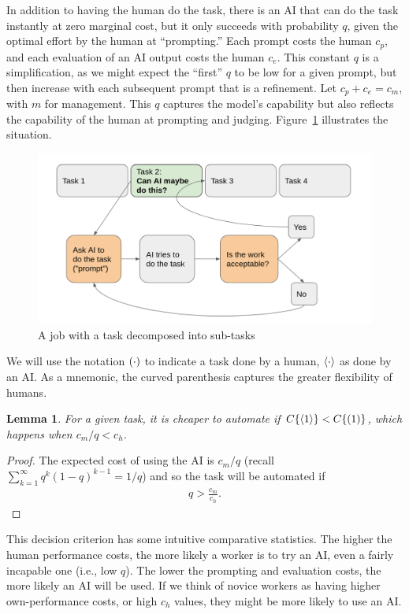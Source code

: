 \documentclass{article}
\newtheorem{lemma}[theorem]{Lemma}
\begin{document}
In addition to having the human do the task, there is an AI that can do the task instantly at zero marginal cost, but it only succeeds with probability $q$, given the optimal effort by the human at ``prompting.''
Each prompt costs the human $c_p$, and each evaluation of an AI output costs the human $c_e$.
This constant $q$ is a simplification, as we might expect the ``first'' $q$ to be low for a given prompt, but then increase with each subsequent prompt that is a refinement.
Let $c_p + c_e = c_m$, with $m$ for management.
This $q$ captures the model's capability but also reflects the capability of the human at prompting and judging.
Figure~\ref{fig:flow} illustrates the situation.

\begin{figure}
\caption{A job with a task decomposed into sub-tasks} \label{fig:flow}
\includegraphics[width = \textwidth]{flow.png}
\end{figure}

We will use the notation $( \cdot )$ to indicate a task done by a human, $\langle \cdot \rangle$ as done by an AI.
As a mnemonic, the curved parenthesis captures the greater flexibility of humans. 

\begin{lemma}
 For a given task, it is cheaper to automate if $C\{ \langle 1 \rangle \} < C\{ ( 1 ) \}$, which happens when $c_m / q < c_h$.
\end{lemma}
\begin{proof}
The expected cost of using the AI is $c_m/q$ (recall ${\sum_{k=1}^\infty q^k (1-q)^{k-1} = 1/q}$) and so 
the task will be automated if
    \begin{align}
    q > \frac{c_m}{c_h}. \nonumber
\end{align}
\end{proof}

This decision criterion has some intuitive comparative statistics.
The higher the human performance costs, the more likely a worker is to try an AI, even a fairly incapable one (i.e., low $q$).
The lower the prompting and evaluation costs, the more likely an AI will be used.
If we think of novice workers as having higher own-performance costs, or high $c_h$ values, they might be more likely to use an AI.
\end{document}
